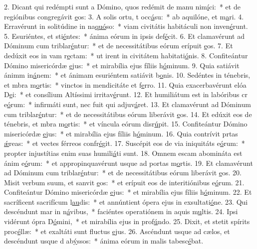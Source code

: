 2. Dicant qui redémpti sunt a Dómino, quos redémit de manu nim\uline{í}ci:~* et de regiónibus congregávit \uline{e}os:
3. A solis ortu, t occ\uline{á}su:~* ab aquilóne, et m\uline{a}ri.
4. Erravérunt in solitúdine in na\uline{quó}so:~* viam civitátis habitáculi non inven\uline{é}runt.
5. Esuriéntes, et sti\uline{é}ntes:~* ánima eórum in ipsis def\uline{é}cit.
6. Et clamavérunt ad Dóminum cum triblar\uline{é}ntur:~* et de necessitátibus eórum erípuit \uline{e}os.
7. Et dedúxit eos in vam r\uline{e}ctam:~* ut irent in civitátem habitati\uline{ó}nis.
8. Confiteántur Dómino misericórdæ \uline{e}jus:~* et mirabília ejus fíliis h\uline{ó}minum.
9. Quia satiávit ánimm in\uline{á}nem:~* et ánimam esuriéntem satiávit b\uline{o}nis.
10. Sedéntes in ténebris, et mbra m\uline{o}rtis:~* vinctos in mendicitáte et f\uline{e}rro.
11. Quia exacerbavérunt elóa D\uline{e}i:~* et consílium Altíssimi irritav\uline{é}runt.
12. Et humiliátum est in labóribus cr e\uline{ó}rum:~* infirmáti sunt, nec fuit qui adjuv\uline{á}ret.
13. Et clamavérunt ad Dóminum cum triblar\uline{é}ntur:~* et de necessitátibus eórum liberávit \uline{e}os.
14. Et edúxit eos de ténebris, et mbra m\uline{o}rtis:~* et víncula eórum disr\uline{ú}pit.
15. Confiteántur Dómino misericórdæ \uline{e}jus:~* et mirabília ejus fíliis h\uline{ó}minum.
16. Quia contrívit prtas \uline{ǽ}reas:~* et vectes férreos confr\uline{é}git.
17. Suscépit eos de via iniquitáts e\uline{ó}rum:~* propter injustítias enim suas humili\uline{á}ti sunt.
18. Omnem escam abomináta est ánim e\uline{ó}rum:~* et appropinquavérunt usque ad portas m\uline{o}rtis.
19. Et clamavérunt ad Dóminum cum triblar\uline{é}ntur:~* et de necessitátibus eórum liberávit \uline{e}os.
20. Misit verbum suum, et sanvit \uline{e}os:~* et erípuit eos de interitiónibus e\uline{ó}rum.
21. Confiteántur Dómino misericórdæ \uline{e}jus:~* et mirabília ejus fíliis h\uline{ó}minum.
22. Et sacríficent sacrifícum l\uline{au}dis:~* et annúntient ópera ejus in exsultati\uline{ó}ne.
23. Qui descéndunt mar in n\uline{á}vibus,~* faciéntes operatiónem in aquis m\uline{u}ltis.
24. Ipsi vidérunt ópra D\uline{ó}mini,~* et mirabília ejus in prof\uline{ú}ndo.
25. Dixit, et stetit spírits proc\uline{é}llæ:~* et exaltáti sunt fluctus \uline{e}jus.
26. Ascéndunt usque ad cælos, et descéndunt usque d ab\uline{ý}ssos:~* ánima eórum in malis tabesc\uline{é}bat.
